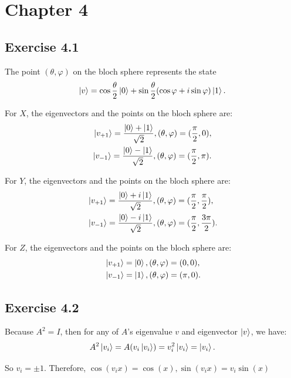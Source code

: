 \section*{Chapter 4}

\subsection*{Exercise 4.1}
The point $(\theta,\varphi)$ on the bloch sphere represents the state
\begin{align}
     \ket{v}=\cos \frac{\theta}{2}\ket{0}+\sin\frac{\theta}{2}(\cos\varphi+i\sin\varphi)\ket{1}.
\end{align}

For $X$, the eigenvectors and the points on the bloch sphere are:
\begin{align}
    \ket{v_{+1}}=\frac{\ket{0}+\ket{1}}{\sqrt{2}}, (\theta,\varphi)=(\frac{\pi}{2},0),\\
    \ket{v_{-1}}=\frac{\ket{0}-\ket{1}}{\sqrt{2}}, (\theta,\varphi)=(\frac{\pi}{2},\pi).
\end{align}

For $Y$, the eigenvectors and the points on the bloch sphere are:
\begin{align}
    &\ket{v_{+1}}=\frac{\ket{0}+i\ket{1}}{\sqrt{2}}, (\theta,\varphi)=(\frac{\pi}{2},\frac{\pi}{2}),\\
    &\ket{v_{-1}}=\frac{\ket{0}-i\ket{1}}{\sqrt{2}}, (\theta,\varphi)=(\frac{\pi}{2},\frac{3\pi}{2}).
\end{align}

For $Z$, the eigenvectors and the points on the bloch sphere are:
\begin{align}
    &\ket{v_{+1}}=\ket{0}, (\theta,\varphi)=(0,0),\\
    &\ket{v_{-1}}=\ket{1},
    (\theta,\varphi)=(\pi,0).
\end{align}


\subsection*{Exercise 4.2}

Because $A^2 = I$, then for any of $A$'s eigenvalue $v$ and eigenvector $\ket{v}$, we have:
\begin{align}
    A^2\ket{v_i}=A(v_i\ket{v_i})=v_i^2\ket{v_i}=\ket{v_i}.
\end{align}

So $v_i=\pm 1$. Therefore, $\cos(v_i x)=\cos(x),\sin(v_i x)=v_i \sin(x)$

